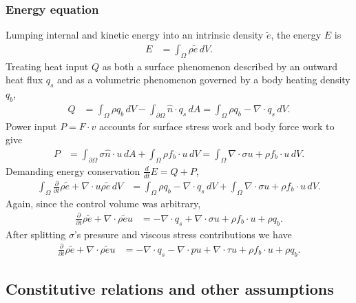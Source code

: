 \documentclass[letterpaper,11pt,nointlimits,reqno]{amsart}
\begin{document}
\subsubsection{Energy equation}
Lumping internal and kinetic energy into an intrinsic density $\tilde{e}$,
the energy $E$ is
\begin{align}
  E &= \int_{\Omega} \rho{}\tilde{e} \, dV
  .
\end{align}
Treating heat input $Q$ as both a surface phenomenon described by an outward
heat flux $q_{s}$ and as a volumetric phenomenon governed by a
body heating density $q_{b}$,
\begin{align}
  Q
  &=
   \int_{\Omega}\rho{}q_{b}\,dV
  -\int_{\partial\Omega}\hat{n}\cdot{}q_{s}\,dA
  =
    \int_{\Omega}\rho{}q_{b} - \nabla\cdot{}q_{s}\,dV
  .
\end{align}
Power input $P=F\cdot{}v$ accounts for surface stress work and body
force work to give
\begin{align}
  P
  &=
    \int_{\partial\Omega} \sigma{}\hat{n} \cdot{} u \, dA
  + \int_{\Omega} \rho{}f_b \cdot{} u \, dV
  = \int_{\Omega} \nabla\cdot{}\sigma{}u + \rho{}f_b \cdot{} u \, dV
  .
\end{align}
Demanding energy conservation $\frac{d}{dt}E=Q+P$,
\begin{align}
  \int_{\Omega}\frac{\partial}{\partial{}t} \rho{}\tilde{e}
  +
  \nabla\cdot{}u\rho{}\tilde{e}
  \,dV
&=
    \int_{\Omega}\rho{}q_{b} - \nabla\cdot{}q_{s}\,dV
  + \int_{\Omega} \nabla\cdot\sigma{}u + \rho{}f_b \cdot{} u \, dV
  .
\end{align}
Again, since the control volume was arbitrary,
\begin{align}
  \frac{\partial}{\partial{}t} \rho{}\tilde{e}
  +
  \nabla\cdot{}\rho{}\tilde{e}u
&=
  - \nabla\cdot{}q_{s}
  + \nabla\cdot\sigma{}u
  + \rho{}f_b \cdot{} u
  + \rho{}q_{b}
  .
\end{align}
After splitting $\sigma$'s pressure and viscous stress contributions we have
\begin{align}
  \label{eq:cons_energy}
  \frac{\partial}{\partial{}t} \rho{}\tilde{e}
  +
  \nabla\cdot{}\rho{}\tilde{e}u
&=
  - \nabla\cdot{}q_{s}
  - \nabla\cdot{}pu
  + \nabla\cdot{}\tau{}u
  + \rho{}f_b \cdot{} u
  + \rho{}q_{b}
  .
\end{align}

\subsection{Constitutive relations and other assumptions}
\end{document}
